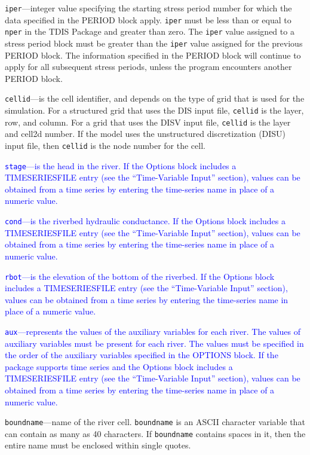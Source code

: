 \begin{description}
\item \texttt{iper}---integer value specifying the starting stress period number for which the data specified in the PERIOD block apply.  \texttt{iper} must be less than or equal to \texttt{nper} in the TDIS Package and greater than zero.  The \texttt{iper} value assigned to a stress period block must be greater than the \texttt{iper} value assigned for the previous PERIOD block.  The information specified in the PERIOD block will continue to apply for all subsequent stress periods, unless the program encounters another PERIOD block.

\item \texttt{cellid}---is the cell identifier, and depends on the type of grid that is used for the simulation.  For a structured grid that uses the DIS input file, \texttt{cellid} is the layer, row, and column.   For a grid that uses the DISV input file, \texttt{cellid} is the layer and cell2d number.  If the model uses the unstructured discretization (DISU) input file, then \texttt{cellid} is the node number for the cell.

\item \textcolor{blue}{\texttt{stage}---is the head in the river. If the Options block includes a TIMESERIESFILE entry (see the ``Time-Variable Input'' section), values can be obtained from a time series by entering the time-series name in place of a numeric value.}

\item \textcolor{blue}{\texttt{cond}---is the riverbed hydraulic conductance. If the Options block includes a TIMESERIESFILE entry (see the ``Time-Variable Input'' section), values can be obtained from a time series by entering the time-series name in place of a numeric value.}

\item \textcolor{blue}{\texttt{rbot}---is the elevation of the bottom of the riverbed.  If the Options block includes a TIMESERIESFILE entry (see the ``Time-Variable Input'' section), values can be obtained from a time series by entering the time-series name in place of a numeric value.}

\item \textcolor{blue}{\texttt{aux}---represents the values of the auxiliary variables for each river. The values of auxiliary variables must be present for each river. The values must be specified in the order of the auxiliary variables specified in the OPTIONS block.  If the package supports time series and the Options block includes a TIMESERIESFILE entry (see the ``Time-Variable Input'' section), values can be obtained from a time series by entering the time-series name in place of a numeric value.}

\item \texttt{boundname}---name of the river cell.  \texttt{boundname} is an ASCII character variable that can contain as many as 40 characters.  If \texttt{boundname} contains spaces in it, then the entire name must be enclosed within single quotes.

\end{description}

